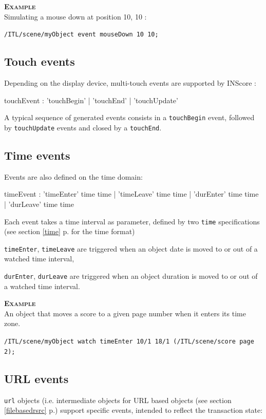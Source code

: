 \documentclass[a4paper,twoside]{report}
\newcommand{\subsublevel}[1]	{\subsection{#1}}
\newcommand{\fullref}[1]	{\ref{#1} p.\pageref{#1}}
\newcommand{\OSC}[1]		{\texttt{#1}}
\newcommand{\example}		{\textbf{\hspace{-1.5cm}\textbf{\textsc{Example }}}}
\let\olditemize\itemize
\let\oldenditemize\enditemize
\renewenvironment{itemize} 	{\olditemize \setlength{\itemsep}{1mm}}{\oldenditemize}
\newcommand{\sample}	[1]			{\vspace{-2mm}\begin{center}\colorbox{mygrey}{
								\begin{minipage}[t]{0.9\columnwidth} 
								{\small \texttt{#1}}
								\end{minipage}}\end{center}}
\newcommand{\samplev}[1]			{\begin{center}\colorbox{mygrey}{
								\begin{minipage}[t]{\columnwidth} 
								{\small \texttt{#1}}
								\end{minipage}}\end{center}}
\begin{document}
\example \\
Simulating a mouse down at position 10, 10 :
\sample{/ITL/scene/myObject event mouseDown 10 10;}

\subsublevel{Touch events}
\label{touchevents}
Depending on the display device, multi-touch events are supported by INScore :
\begin{rail}
touchEvent : 'touchBegin' | 'touchEnd' | 'touchUpdate' 
\end{rail}

A typical sequence of generated events consists in a \OSC{touchBegin} event, followed by \OSC{touchUpdate} events and closed by a \OSC{touchEnd}.

\subsublevel{Time events}
\label{timeevents}

Events are also defined on the time domain:
\begin{rail}
timeEvent : 	'timeEnter' time time | 'timeLeave' time time 
		| 'durEnter' time time | 'durLeave' time time 
\end{rail}

Each event takes a time interval as parameter, defined by two \OSC{time} specifications (see section \fullref{time} for the time format)

\begin{itemize}
\item \OSC{timeEnter}, \OSC{timeLeave} are triggered when an object date is moved to or out of a watched time interval,
\item \OSC{durEnter}, \OSC{durLeave} are triggered when an object duration is moved to or out of a watched time interval.
\end{itemize}

\example \\
An object that moves a score to a given page number when it enters its time zone.
\samplev{/ITL/scene/myObject watch timeEnter 10/1 18/1 (/ITL/scene/score page 2);}

\subsublevel{URL events}
\label{urlevents}

\OSC{url} objects (i.e. intermediate objects for URL based objects (see section \fullref{filebasedrsrc}) support specific events, intended to reflect the transaction state:
\end{document}
